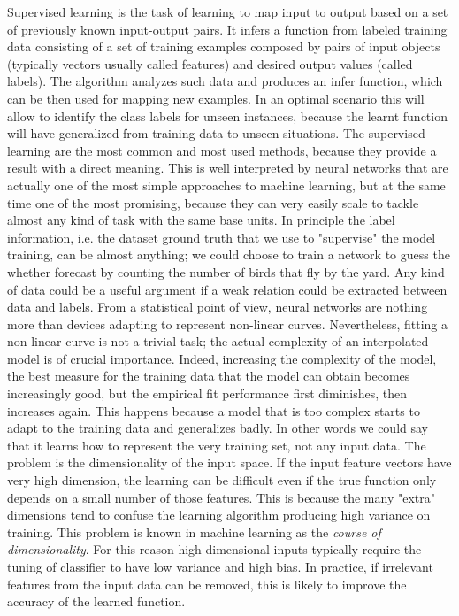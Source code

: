 Supervised learning is the task of learning to map input to output based on a set of previously known input-output pairs. It infers a function from labeled training data consisting of a set of training examples composed by pairs of input objects (typically vectors usually called features) and desired output values (called labels). The algorithm analyzes such data and produces an infer function, which can be then used for mapping new examples. In an optimal scenario this will allow to identify the class labels for unseen instances, because the learnt function will have generalized from training data to unseen situations.
The supervised learning are the most common and most used methods, because they provide a result with a direct meaning. 
This is well interpreted by neural networks that are actually one of the most simple approaches to machine learning, but at the same time one of the most promising, because they can very easily scale to tackle almost any kind of task with the same base units.
%
In principle the label information, i.e. the dataset ground truth that we use to "supervise" the model training, can be almost anything; we could choose to train a network to guess the whether forecast by counting the number of birds that fly by the yard. Any kind of data could be a useful argument if a weak relation could be extracted between data and labels.
From a statistical point of view, neural networks are nothing more than devices adapting to represent non-linear curves. 
Nevertheless, fitting a non linear curve is not a trivial task; the actual complexity of an interpolated model is of crucial importance. 
Indeed, increasing the complexity of the model, the best measure for the training data that the model can obtain becomes increasingly good, but the empirical fit performance first diminishes, then increases again. This happens because a model that is too complex starts to adapt to the training data and generalizes badly. In other words we could say that it learns how to represent the very training set, not any input data.
%
The problem is the dimensionality of the input space. If the input feature vectors have very high dimension, the learning can be difficult even if the true function only depends on a small number of those features.  This is because the many "extra" dimensions tend to confuse the learning algorithm producing high variance on training. 
This problem is known in machine learning as the \textit{course of dimensionality}.
For this reason high dimensional inputs typically require the tuning of classifier to have low variance and high bias. In practice, if irrelevant features from the input data can be removed, this is likely to improve the accuracy of the learned function. 

